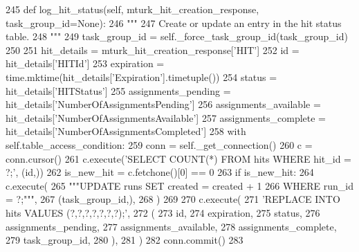 \begin{DoxyCode}
245     \textcolor{keyword}{def }log\_hit\_status(self, mturk\_hit\_creation\_response, task\_group\_id=None):
246         \textcolor{stringliteral}{"""}
247 \textcolor{stringliteral}{        Create or update an entry in the hit status table.}
248 \textcolor{stringliteral}{        """}
249         task\_group\_id = self.\_force\_task\_group\_id(task\_group\_id)
250 
251         hit\_details = mturk\_hit\_creation\_response[\textcolor{stringliteral}{'HIT'}]
252         id = hit\_details[\textcolor{stringliteral}{'HITId'}]
253         expiration = time.mktime(hit\_details[\textcolor{stringliteral}{'Expiration'}].timetuple())
254         status = hit\_details[\textcolor{stringliteral}{'HITStatus'}]
255         assignments\_pending = hit\_details[\textcolor{stringliteral}{'NumberOfAssignmentsPending'}]
256         assignments\_available = hit\_details[\textcolor{stringliteral}{'NumberOfAssignmentsAvailable'}]
257         assignments\_complete = hit\_details[\textcolor{stringliteral}{'NumberOfAssignmentsCompleted'}]
258         with self.table\_access\_condition:
259             conn = self.\_get\_connection()
260             c = conn.cursor()
261             c.execute(\textcolor{stringliteral}{'SELECT COUNT(*) FROM hits WHERE hit\_id = ?;'}, (id,))
262             is\_new\_hit = c.fetchone()[0] == 0
263             \textcolor{keywordflow}{if} is\_new\_hit:
264                 c.execute(
265                     \textcolor{stringliteral}{"""UPDATE runs SET created = created + 1}
266 \textcolor{stringliteral}{                             WHERE run\_id = ?;"""},
267                     (task\_group\_id,),
268                 )
269 
270             c.execute(
271                 \textcolor{stringliteral}{'REPLACE INTO hits VALUES (?,?,?,?,?,?,?);'},
272                 (
273                     id,
274                     expiration,
275                     status,
276                     assignments\_pending,
277                     assignments\_available,
278                     assignments\_complete,
279                     task\_group\_id,
280                 ),
281             )
282             conn.commit()
283 
\end{DoxyCode}
\mbox{\label{classparlai_1_1mturk_1_1core_1_1mturk__data__handler_1_1MTurkDataHandler_a33facd12d38fa532a28a113b909073a6}} 
